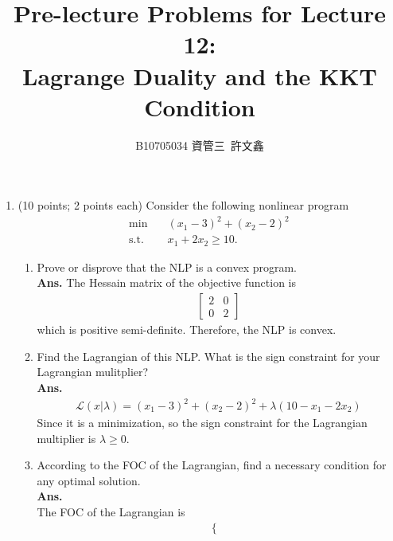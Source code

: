 \documentclass[12pt]{article}
\title{Pre-lecture Problems for Lecture 12:\\ Lagrange Duality and the KKT Condition}
\author{B10705034 資管三\ 許文鑫}
\begin{document}
\maketitle
\begin{enumerate}
      \item (10 points; 2 points each) Consider the following nonlinear program
            \begin{align*}
                  \min \quad        & (x_1 -3)^2 + (x_2 -2)^2 \\
                  \text{s.t.} \quad & x_1 + 2x_2 \geq 10.
            \end{align*}
            \begin{enumerate}
                  \item Prove or disprove that the NLP is a convex program.\\
                        \textbf{Ans.}
                        The Hessain matrix of the objective function is
                        \begin{align*}
                              \begin{bmatrix}
                                    2 & 0 \\
                                    0 & 2
                              \end{bmatrix}
                        \end{align*}
                        which is positive semi-definite. Therefore, the NLP is convex.
                  \item Find the Lagrangian of this NLP. What is the sign constraint for your Lagrangian mulitplier?\\
                        \textbf{Ans.}
                        \begin{align*}
                              \mathcal{L}(x|\lambda) = (x_1 -3)^2 + (x_2 -2)^2 + \lambda(10 - x_1 - 2x_2)
                        \end{align*}
                        Since it is a minimization, so the sign constraint for the Lagrangian multiplier is $\lambda \geq 0$.
                  \item According to the FOC of the Lagrangian, find a necessary condition for any optimal solution.\\
                        \textbf{Ans.}\\
                        The FOC of the Lagrangian is
                        \begin{align*}
                              \begin{cases}

\end{cases}
\end{align*}
\end{enumerate}
\end{enumerate}
\end{document}

